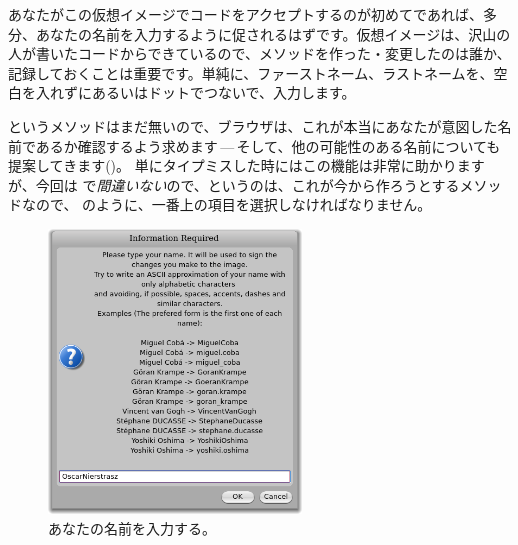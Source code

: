 \documentclass[a4paper,10pt,twoside]{book}
\begin{document}
あなたがこの仮想イメージでコードをアクセプトするのが初めてであれば、多分、あなたの名前を入力するように促されるはずです。仮想イメージは、沢山の人が書いたコードからできているので、メソッドを作った・変更したのは誰か、記録しておくことは重要です。単純に、ファーストネーム、ラストネームを、空白を入れずにあるいはドットでつないで、入力します。


 というメソッドはまだ無いので、ブラウザは、これが本当にあなたが意図した名前であるか確認するよう求めます\,---\,そして、他の可能性のある名前についても提案してきます()。
単にタイプミスした時にはこの機能は非常に助かりますが、今回は  で\emph{間違いない}ので、というのは、これが今から作ろうとするメソッドなので、 のように、一番上の項目を選択しなければなりません。



\begin{figure}[htb]
\centerline {\includegraphics[width=0.6\textwidth]{name}}
\caption{あなたの名前を入力する。}
\end{figure}
\end{document}
